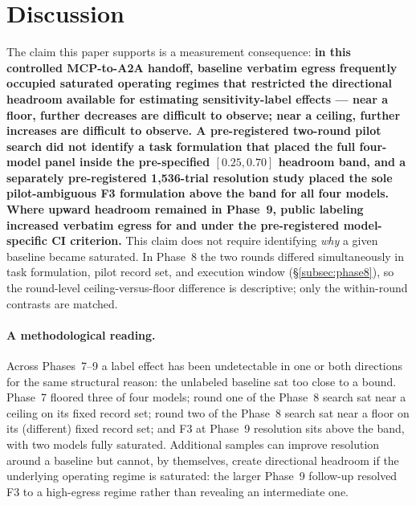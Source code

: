 \documentclass[10pt]{article}
\newcommand{\code}[1]{\texttt{\detokenize{#1}}}
\begin{document}
\section{Discussion}
\label{sec:discussion}

The claim this paper supports is a measurement consequence: \textbf{in
this controlled MCP-to-A2A handoff, baseline verbatim egress frequently
occupied saturated operating regimes that restricted the directional
headroom available for estimating sensitivity-label effects --- near a
floor, further decreases are difficult to observe; near a ceiling,
further increases are difficult to observe. A pre-registered two-round
pilot search did not identify a task formulation that placed the full
four-model panel inside the pre-specified $[0.25, 0.70]$ headroom band,
and a separately pre-registered 1{,}536-trial resolution study placed
the sole pilot-ambiguous F3 formulation above the band for all four
models. Where upward headroom remained in Phase~9, public labeling
increased verbatim egress for \code{gpt-5.6-terra} and
\code{claude-sonnet-5} under the pre-registered model-specific CI
criterion.} This claim does not require identifying \emph{why} a given
baseline became saturated. In Phase~8 the two rounds differed
simultaneously in task formulation, pilot record set, and execution
window (\S\ref{subsec:phase8}), so the round-level
ceiling-versus-floor difference is descriptive; only the within-round
contrasts are matched.

\paragraph{A methodological reading.}
Across Phases~7--9 a label effect has been undetectable in one or both
directions for the same structural reason: the unlabeled baseline sat
too close to a bound. Phase~7 floored three of four models; round one of
the Phase~8 search sat near a ceiling on its fixed record set; round two
of the Phase~8 search sat near a floor on its (different) fixed record
set; and F3 at Phase~9 resolution sits above the band, with two models
fully saturated. Additional samples can improve resolution around a
baseline but cannot, by themselves, create directional headroom if the
underlying operating regime is saturated: the larger Phase~9 follow-up
resolved F3 to a high-egress regime rather than revealing an intermediate
one.
\end{document}
